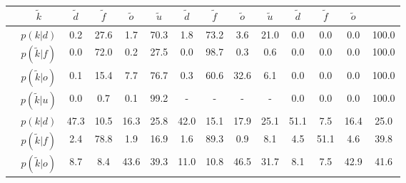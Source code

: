 \begin{center}
	\footnotesize
	\begin{tabular}{c|c|cccc|cccc|cccc}
		&$\tilde{k}$ & $\tilde{d}$ & $\tilde{f}$ & $\tilde{o}$ & $\tilde{u}$ & $\tilde{d}$ & $\tilde{f}$ & $\tilde{o}$ & $\tilde{u}$ & $\tilde{d}$ & $\tilde{f}$ & $\tilde{o}$\\
		\hline
		\parbox[t]{2mm}{}&$p(k|d)$ & \textcolor{mygreen}{0.2} & \textcolor{myred}{27.6} & \textcolor{myred}{1.7} & 70.3 & \textcolor{mygreen}{1.8} & \textcolor{myred}{73.2} & \textcolor{myred}{3.6} & 21.0 & \textcolor{mygreen}{0.0} & \textcolor{myred}{0.0} & \textcolor{myred}{0.0} & 100.0\\
		&$p(\tilde{k}|f)$ & \textcolor{myred}{0.0} & \textcolor{mygreen}{72.0} & \textcolor{myred}{0.2} & 27.5 & \textcolor{myred}{0.0} & \textcolor{mygreen}{98.7} & \textcolor{myred}{0.3} & 0.6 & \textcolor{myred}{0.0} & \textcolor{mygreen}{0.0} & \textcolor{myred}{0.0} & 100.0\\
		&$p(\tilde{k}|o)$ & \textcolor{myred}{0.1} & \textcolor{myred}{15.4} & \textcolor{mygreen}{7.7} & 76.7 & \textcolor{myred}{0.3} & \textcolor{myred}{60.6} & \textcolor{mygreen}{32.6} & 6.1 & \textcolor{myred}{0.0} & \textcolor{myred}{0.0} & \textcolor{mygreen}{0.0} & 100.0\\
		&$p(\tilde{k}|u)$ & 0.0 & 0.7 & 0.1 & 99.2 & - & - & - & - & 0.0 & 0.0 & 0.0 & 100.0\\
		\hline
		\parbox[t]{2mm}{}&$p(k|d)$ & \textcolor{mygreen}{47.3} & \textcolor{myred}{10.5} & \textcolor{myred}{16.3} & 25.8 & \textcolor{mygreen}{42.0} & \textcolor{myred}{15.1} & \textcolor{myred}{17.9} & 25.1 & \textcolor{mygreen}{51.1} & \textcolor{myred}{7.5} & \textcolor{myred}{16.4} & 25.0\\
		&$p(\tilde{k}|f)$ & \textcolor{myred}{2.4} & \textcolor{mygreen}{78.8} & \textcolor{myred}{1.9} & 16.9 & \textcolor{myred}{1.6} & \textcolor{mygreen}{89.3} & \textcolor{myred}{0.9} & 8.1 & \textcolor{myred}{4.5} & \textcolor{mygreen}{51.1} & \textcolor{myred}{4.6} & 39.8\\
		&$p(\tilde{k}|o)$ & \textcolor{myred}{8.7} & \textcolor{myred}{8.4} & \textcolor{mygreen}{43.6} & 39.3 & \textcolor{myred}{11.0} & \textcolor{myred}{10.8} & \textcolor{mygreen}{46.5} & 31.7 & \textcolor{myred}{8.1} & \textcolor{myred}{7.5} & \textcolor{mygreen}{42.9} & 41.6\\

\end{tabular}
\end{center}

